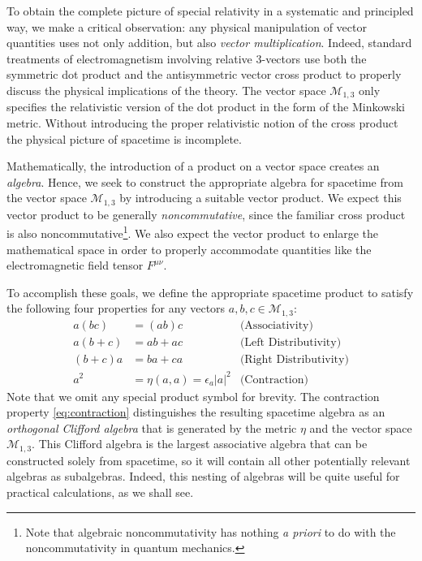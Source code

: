 \documentclass[1p,sort&compress]{elsarticle}
\numberwithin{equation}{section}
\begin{document}
To obtain the complete picture of special relativity in a systematic and principled way, we make a critical observation: any physical manipulation of vector quantities uses not only addition, but also \emph{vector multiplication}.  Indeed, standard treatments of electromagnetism involving relative 3-vectors use both the symmetric dot product and the antisymmetric vector cross product to properly discuss the physical implications of the theory.  The vector space $\mathcal{M}_{1,3}$ only specifies the relativistic version of the dot product in the form of the Minkowski metric.  Without introducing the proper relativistic notion of the cross product the physical picture of spacetime is incomplete.

Mathematically, the introduction of a product on a vector space creates an \emph{algebra}.  Hence, we seek to construct the appropriate algebra for spacetime from the vector space $\mathcal{M}_{1,3}$ by introducing a suitable vector product.  We expect this vector product to be generally \emph{noncommutative}, since the familiar cross product is also noncommutative\footnote{Note that algebraic noncommutativity has nothing \emph{a priori} to do with the noncommutativity in quantum mechanics.}.  We also expect the vector product to enlarge the mathematical space in order to properly accommodate quantities like the electromagnetic field tensor $F^{\mu\nu}$.

To accomplish these goals, we define the appropriate spacetime product to satisfy the following four properties for any vectors $a,b,c \in \mathcal{M}_{1,3}$:
\begin{subequations}
\begin{align}
  a(bc) &= (ab)c \qquad\qquad & \mbox{(Associativity)} \\
  a(b+c) &= ab + ac & \mbox{(Left Distributivity)} \\
  (b+c)a &= ba + ca & \mbox{(Right Distributivity)} \\
  \label{eq:contraction}
  a^2 &= \eta(a,a) = \epsilon_a |a|^2 & \mbox{(Contraction)}
\end{align}
\end{subequations}
Note that we omit any special product symbol for brevity.  The contraction property \eqref{eq:contraction} distinguishes the resulting spacetime algebra as an \emph{orthogonal Clifford algebra} \cite{Crumeyrolle1990} that is generated by the metric $\eta$ and the vector space $\mathcal{M}_{1,3}$.  This Clifford algebra is the largest associative algebra that can be constructed solely from spacetime, so it will contain all other potentially relevant algebras as subalgebras.  Indeed, this nesting of algebras will be quite useful for practical calculations, as we shall see.
\end{document}
